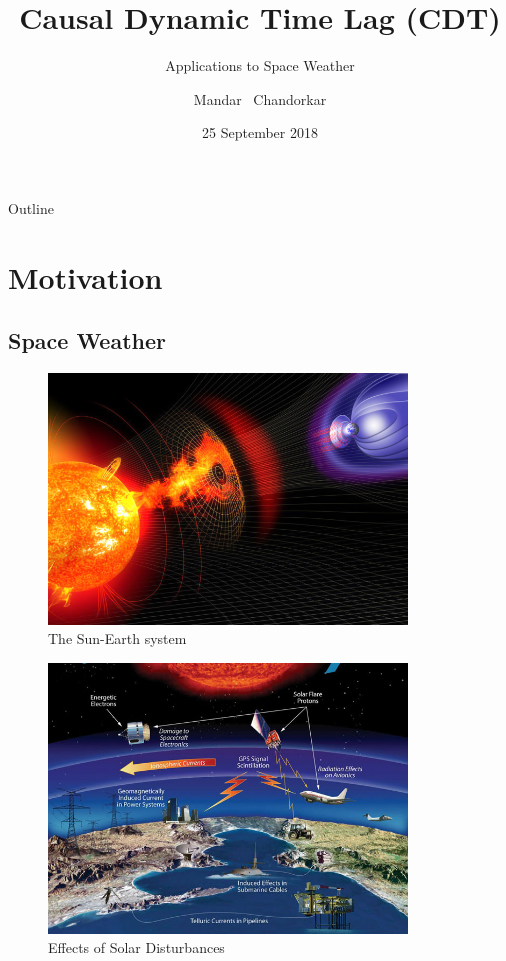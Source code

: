 \documentclass{beamer}
\title{Causal Dynamic Time Lag (CDT)}
\subtitle{Applications to Space Weather}
\author{Mandar ~Chandorkar}
\institute[CWI \& INRIA] %
{
  \inst{1}%
  Multiscale Dynamics\\
  CWI, Amsterdam
  \and
  \inst{2}%
  TAU Research Unit\\
  INRIA, Paris-Saclay}
\date{25 September 2018}
\begin{document}
\begin{frame}
  \titlepage
\end{frame}

\begin{frame}{Outline}
  \tableofcontents
\end{frame}

\section{Motivation}

\subsection{Space Weather}

\begin{frame}
\begin{figure}[h]
        \includegraphics[width=0.85\textwidth]{space-weather.jpg}
        \caption{The Sun-Earth system}
        \label{fig:sun-earth}
\end{figure}
\end{frame}

\begin{frame}
\begin{figure}[h]
        \includegraphics[width=0.85\textwidth]{nasa-space-weather.jpg}
        \caption{Effects of Solar Disturbances}
        \label{fig:sun-earth-nasa}
\end{figure}
\end{frame}
\end{document}
